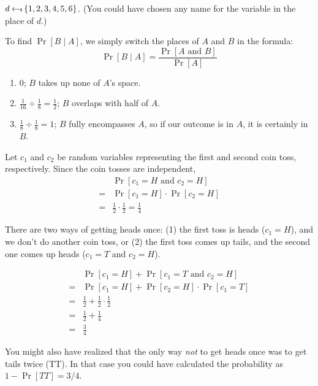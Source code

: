 \begin{answer}
    $d \hskip2.3pt{\gets\!\!\mbox{\tiny${\$}$\normalsize}}\, \{1, 2, 3, 4, 5, 6\}$. (You could have chosen any name for the variable in the place of $d$.)
\end{answer}

\begin{answer}
    To find $\Pr[B \mid A]$, we simply switch the places of $A$ and $B$ 
    in the formula:
    \[
        \Pr[B \mid A] = \frac{\Pr[A \text{ and } B]}{\Pr[A]}
    \]
    \renewcommand{\labelenumi}{(\alph{enumi})} 
    \begin{enumerate}
        \item 0; $B$ takes up none of $A$'s space.
        \item $\frac{1}{16} \div \frac{1}{8} = \frac{1}{2}$; $B$ overlaps 
        with half of $A$.
        \item $\frac{1}{8} \div \frac{1}{8} = 1$; $B$ fully encompasses $A$, so if our 
        outcome is in $A$, it is certainly in $B$.
    \end{enumerate}
\end{answer}

\begin{answer}
    Let $c_1$ and $c_2$ be random variables representing the first and second
    coin toss, respectively. Since the coin tosses are independent, 
    \begin{align*}
        & \Pr[c_1=H \text{ and } c_2=H]\\
        =& \Pr[c_1=H] \cdot \Pr[c_2=H]\\
        =& \frac{1}{2} \cdot \frac{1}{2} = \frac{1}{4}
    \end{align*}
\end{answer}

\begin{answer}
    There are two ways of getting heads once: (1) the first toss is heads 
    ($c_1=H$), and we don't do another coin toss, or (2) the first toss comes up tails,
    and the second one comes up heads ($c_1=T$ and $c_2=H$). 
    
    \begin{align*}
        & \Pr[c_1=H] + \Pr[c_1=T \text{ and } c_2=H]\\
        =& \Pr[c_1=H] + \Pr[c_2=H] \cdot \Pr[c_1=T] 
        \tag{coin tosses are independent events}\\
        =& \frac{1}{2} + \frac{1}{2}\cdot\frac{1}{2}\\
        =& \frac{1}{2} + \frac{1}{4}\\
        =& \frac{3}{4}
    \end{align*}

    You might also have realized that the only way \emph{not} to get heads once was to get tails twice (TT). In that case you could have calculated the probability as $1 - \Pr[TT] = 3/4$.
\end{answer}

